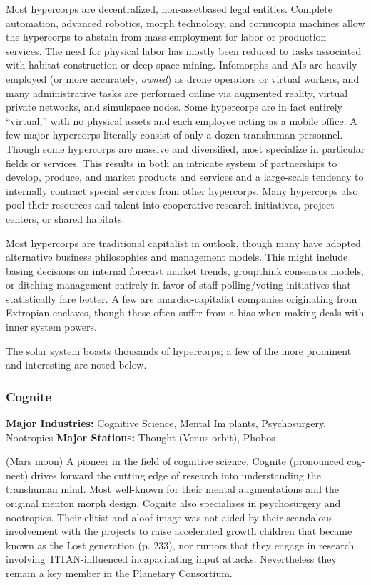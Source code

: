 Most hypercorps are decentralized, non-assetbased legal entities. Complete automation, advanced 
robotics, morph technology, and cornucopia machines allow the hypercorps to abstain from mass 
employment for labor or production services. The 
need for physical labor has mostly been reduced 
to tasks associated with habitat construction or 
deep space mining. Infomorphs and AIs are heavily 
employed (or more accurately, \textit{owned}) as drone operators or virtual workers, and many administrative 
tasks are performed online via augmented reality, 
virtual private networks, and simulspace nodes. 
Some hypercorps are in fact entirely ``virtual,'' with 
no physical assets and each employee acting as a 
mobile office. A few major hypercorps literally consist of only a dozen transhuman personnel. Though 
some hypercorps are massive and diversified, most 
specialize in particular fields or services. This results 
in both an intricate system of partnerships to develop, produce, and market products and services 
and a large-scale tendency to internally contract 
special services from other hypercorps. Many hypercorps also pool their resources and talent into 
cooperative research initiatives, project centers, or 
shared habitats.

Most hypercorps are traditional capitalist in outlook, though many have adopted alternative business 
philosophies and management models. This might 
include basing decisions on internal forecast market 
trends, groupthink consensus models, or ditching 
management entirely in favor of staff polling/voting 
initiatives that statistically fare better. A few are anarcho-capitalist companies originating from Extropian 
enclaves, though these often suffer from a bias when 
making deals with inner system powers.

The solar system boasts thousands of hypercorps; 
a few of the more prominent and interesting are 
noted below.

\subsubsection{Cognite}

\textbf{Major Industries:} Cognitive Science, Mental Im
plants, Psychosurgery, Nootropics
\textbf{Major Stations:} Thought (Venus orbit), Phobos 

(Mars moon)
A pioneer in the field of cognitive science, Cognite 
(pronounced cog-neet) drives forward the cutting 
edge of research into understanding the transhuman 
mind. Most well-known for their mental augmentations and the original menton morph design, Cognite 
also specializes in psychosurgery and nootropics. 
Their elitist and aloof image was not aided by their 
scandalous involvement with the projects to raise accelerated growth children that became known as the 
Lost generation (p. 233), nor rumors that they engage 
in research involving TITAN-influenced incapacitating 
input attacks. Nevertheless they remain a key member 
in the Planetary Consortium.


